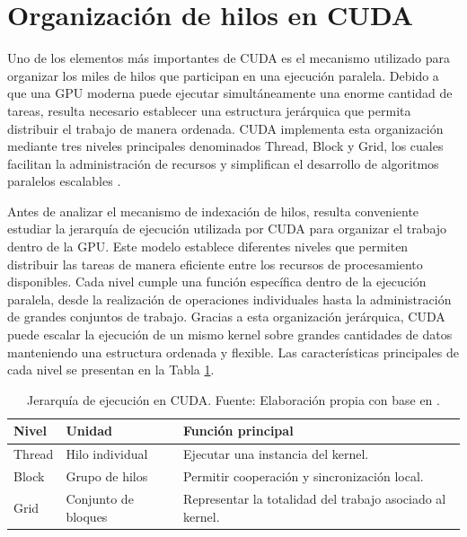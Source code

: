 \section{Organización de hilos en CUDA}

Uno de los elementos más importantes de CUDA es el mecanismo utilizado para organizar los miles de hilos que participan en una ejecución paralela. Debido a que una GPU moderna puede ejecutar simultáneamente una enorme cantidad de tareas, resulta necesario establecer una estructura jerárquica que permita distribuir el trabajo de manera ordenada. CUDA implementa esta organización mediante tres niveles principales denominados Thread, Block y Grid, los cuales facilitan la administración de recursos y simplifican el desarrollo de algoritmos paralelos escalables \cite{threadHierarchy,investigacionCUDA}.

Antes de analizar el mecanismo de indexación de hilos, resulta conveniente estudiar la jerarquía de ejecución utilizada por CUDA para organizar el trabajo dentro de la GPU. Este modelo establece diferentes niveles que permiten distribuir las tareas de manera eficiente entre los recursos de procesamiento disponibles. Cada nivel cumple una función específica dentro de la ejecución paralela, desde la realización de operaciones individuales hasta la administración de grandes conjuntos de trabajo. Gracias a esta organización jerárquica, CUDA puede escalar la ejecución de un mismo kernel sobre grandes cantidades de datos manteniendo una estructura ordenada y flexible. Las características principales de cada nivel se presentan en la Tabla \ref{tab:jerarquia_cuda}.

\begin{table}[H]
\centering
\caption{Jerarquía de ejecución en CUDA. Fuente: Elaboración propia con base en \cite{threadHierarchy,nvidiaProgrammingGuide}.}
\label{tab:jerarquia_cuda}
\begin{tabular}{|p{3cm}|p{4cm}|p{7cm}|}
\hline
\textbf{Nivel} & \textbf{Unidad} & \textbf{Función principal} \\
\hline
Thread & Hilo individual & Ejecutar una instancia del kernel. \\
\hline
Block & Grupo de hilos & Permitir cooperación y sincronización local. \\
\hline
Grid & Conjunto de bloques & Representar la totalidad del trabajo asociado al kernel. \\
\hline
\end{tabular}
\end{table}

